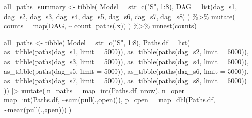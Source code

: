 \documentclass[
  letterpaper,
  DIV=11,
  numbers=noendperiod]{scrartcl}
\newenvironment{Shaded}{\begin{snugshade}}{\end{snugshade}}
\newcommand{\AttributeTok}[1]{\textcolor[rgb]{0.40,0.45,0.13}{#1}}
\newcommand{\DecValTok}[1]{\textcolor[rgb]{0.68,0.00,0.00}{#1}}
\newcommand{\FunctionTok}[1]{\textcolor[rgb]{0.28,0.35,0.67}{#1}}
\newcommand{\NormalTok}[1]{\textcolor[rgb]{0.00,0.23,0.31}{#1}}
\newcommand{\OtherTok}[1]{\textcolor[rgb]{0.00,0.23,0.31}{#1}}
\newcommand{\SpecialCharTok}[1]{\textcolor[rgb]{0.37,0.37,0.37}{#1}}
\newcommand{\StringTok}[1]{\textcolor[rgb]{0.13,0.47,0.30}{#1}}
\begin{document}
\begin{Shaded}
\begin{Highlighting}[]
\NormalTok{all\_paths\_summary }\OtherTok{\textless{}{-}} \FunctionTok{tibble}\NormalTok{(}
  \AttributeTok{Model =} \FunctionTok{str\_c}\NormalTok{(}\StringTok{"S"}\NormalTok{, }\DecValTok{1}\SpecialCharTok{:}\DecValTok{8}\NormalTok{),}
  \AttributeTok{DAG   =} \FunctionTok{list}\NormalTok{(dag\_s1, dag\_s2, dag\_s3, dag\_s4, dag\_s5, dag\_s6, dag\_s7, dag\_s8)}
\NormalTok{) }\SpecialCharTok{\%\textgreater{}\%}
  \FunctionTok{mutate}\NormalTok{(}
    \AttributeTok{counts =} \FunctionTok{map}\NormalTok{(DAG, }\SpecialCharTok{\textasciitilde{}} \FunctionTok{count\_paths}\NormalTok{(.x))}
\NormalTok{  ) }\SpecialCharTok{\%\textgreater{}\%}
  \FunctionTok{unnest}\NormalTok{(counts)}

\NormalTok{all\_paths }\OtherTok{\textless{}{-}} \FunctionTok{tibble}\NormalTok{(}
    \AttributeTok{Model =} \FunctionTok{str\_c}\NormalTok{(}\StringTok{"S"}\NormalTok{, }\DecValTok{1}\SpecialCharTok{:}\DecValTok{8}\NormalTok{),}
    \AttributeTok{Paths.df =} \FunctionTok{list}\NormalTok{(}
        \FunctionTok{as\_tibble}\NormalTok{(}\FunctionTok{paths}\NormalTok{(dag\_s1,  }\AttributeTok{limit =} \DecValTok{5000}\NormalTok{)),}
        \FunctionTok{as\_tibble}\NormalTok{(}\FunctionTok{paths}\NormalTok{(dag\_s2,  }\AttributeTok{limit =} \DecValTok{5000}\NormalTok{)),}
        \FunctionTok{as\_tibble}\NormalTok{(}\FunctionTok{paths}\NormalTok{(dag\_s3,  }\AttributeTok{limit =} \DecValTok{5000}\NormalTok{)),}
        \FunctionTok{as\_tibble}\NormalTok{(}\FunctionTok{paths}\NormalTok{(dag\_s4,  }\AttributeTok{limit =} \DecValTok{5000}\NormalTok{)),}
        \FunctionTok{as\_tibble}\NormalTok{(}\FunctionTok{paths}\NormalTok{(dag\_s5,  }\AttributeTok{limit =} \DecValTok{5000}\NormalTok{)),}
        \FunctionTok{as\_tibble}\NormalTok{(}\FunctionTok{paths}\NormalTok{(dag\_s6,  }\AttributeTok{limit =} \DecValTok{5000}\NormalTok{)),}
        \FunctionTok{as\_tibble}\NormalTok{(}\FunctionTok{paths}\NormalTok{(dag\_s7,  }\AttributeTok{limit =} \DecValTok{5000}\NormalTok{)),}
        \FunctionTok{as\_tibble}\NormalTok{(}\FunctionTok{paths}\NormalTok{(dag\_s8,  }\AttributeTok{limit =} \DecValTok{5000}\NormalTok{))}
\NormalTok{    )) }\SpecialCharTok{|\textgreater{}} 
    \FunctionTok{mutate}\NormalTok{(}
        \AttributeTok{n\_paths =} \FunctionTok{map\_int}\NormalTok{(Paths.df, nrow),}
        \AttributeTok{n\_open =} \FunctionTok{map\_int}\NormalTok{(Paths.df, }\SpecialCharTok{\textasciitilde{}}\FunctionTok{sum}\NormalTok{(}\FunctionTok{pull}\NormalTok{(.,open))),}
        \AttributeTok{p\_open =} \FunctionTok{map\_dbl}\NormalTok{(Paths.df, }\SpecialCharTok{\textasciitilde{}}\FunctionTok{mean}\NormalTok{(}\FunctionTok{pull}\NormalTok{(.,open)))}
\NormalTok{    )}


\end{Highlighting}
\end{Shaded}
\end{document}

